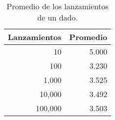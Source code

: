 \documentclass[12pt]{article}
\begin{document}
		\begin{table}[h]
		\caption{Promedio de los lanzamientos de un dado.}
		\label{dado}
		\centering
		\begin{tabular}{|r|r|}
			\hline
			\bf Lanzamientos & \bf Promedio \\
			\hline
			10 & 5.000 \\
			100 & 3.230 \\
			1,000 & 3.525 \\
			10,000 & 3.492 \\
			100,000 & 3.503 \\
			\hline
		\end{tabular}
	\end{table}
	


\end{document}
